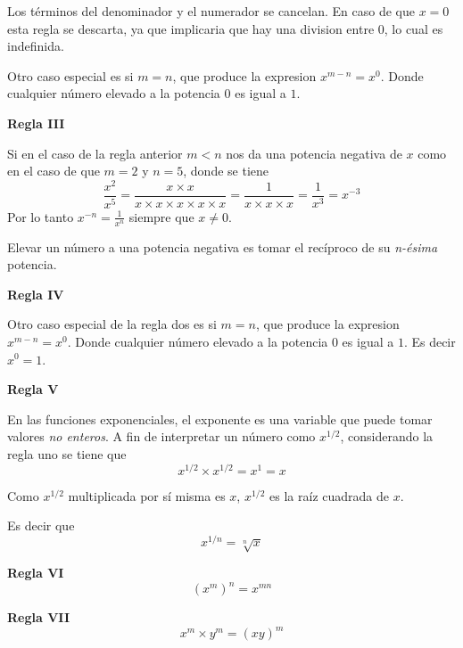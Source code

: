 Los términos del denominador y el numerador se cancelan. En caso de que \(x=0\) esta regla se descarta, ya que implicaria que hay una division entre \(0\), lo cual es indefinida.

Otro caso especial es si \(m=n\), que produce la expresion \(x^{m-n} = x^0\). Donde cualquier número elevado a la potencia \(0\) es igual a \(1\).

\textbf{Regla III}

Si en el caso de la regla anterior \(m<n\) nos da una potencia negativa de \(x\) como en el caso de que \(m=2\) y  \(n=5\), donde se tiene
\[
\frac{x^2}{x^5} = \frac{x \times x}{x \times x \times x \times x \times x} = \frac{1}{x \times x \times x} = \frac{1}{x^3} = x^{-3}
\]
Por lo tanto \(x^{-n}=\frac{1}{x^n}\) siempre que \(x \neq 0\). 

Elevar un número a una potencia negativa es tomar el recíproco de su \textit{n-ésima} potencia.

\textbf{Regla IV}

Otro caso especial de la regla dos es si \(m=n\), que produce la expresion \(x^{m-n} = x^0\). Donde cualquier número elevado a la potencia \(0\) es igual a \(1\). Es decir \(x^0=1\).

\textbf{Regla V}

En las funciones exponenciales, el exponente es una variable que puede tomar valores \textit{no enteros}. A fin de interpretar un número como \(x^{1/2}\), considerando la regla uno se tiene que 
\[x^{1/2} \times x^{1/2} = x^1 = x\]

Como \(x^{1/2}\) multiplicada por sí misma es \(x\), \(x^{1/2}\) es la raíz cuadrada de \(x\). 

Es decir que \[x^{1/n}=\sqrt[n]{x}\]

\textbf{Regla VI}
\[(x^m)^n = x^{mn}\]

\textbf{Regla VII} 
\[x^m \times y^m = (xy)^m\]

